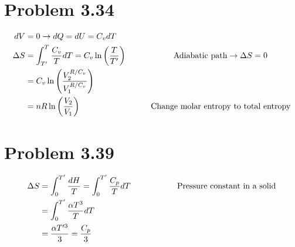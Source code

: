 \documentclass[10pt]{article} %
\begin{document}
\section{Problem 3.34}
\begin{align*}
  dV &= 0 \rightarrow dQ = dU = C_v dT\\
  \Delta S &= \int_{T'}^T \frac{C_v}{T} dT = C_v\ln\left(\frac{T}{T'}\right)
  \hspace*{2cm} \mbox{Adiabatic path} \rightarrow \Delta S = 0\\
  &= C_v\ln\left(\frac{V_2^{R/C_v}}{V_1^{R/C_v}}\right)\\
  &= nR\ln\left(\frac{V_2}{V_1}\right)
  \hspace*{3cm}\mbox{Change molar entropy to total entropy}\\
\end{align*}

\section{Problem 3.39}
\begin{align*}
  \Delta S &= \int_0^{T'} \frac{dH}{T} = \int_0^{T'}\frac{C_p}{T}dT
  \hspace*{2cm} \mbox{Pressure constant in a solid}\\
  &= \int_0^{T'}\frac{\alpha T^3}{T}dT\\
  &= \frac{\alpha T'^3}{3} = \frac{C_p}{3}\\
\end{align*}
\end{document}
